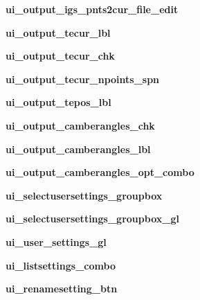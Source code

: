 \begin{DoxyCompactItemize}
{\bfseries ui\+\_\+output\+\_\+igs\+\_\+pnts2cur\+\_\+file\+\_\+edit}
\item 
\hypertarget{a00075_af6b3a50b9ed8b101a02f8cd2103add7a}{}\label{a00075_af6b3a50b9ed8b101a02f8cd2103add7a} 
{\bfseries ui\+\_\+output\+\_\+tecur\+\_\+lbl}
\item 
\hypertarget{a00075_a8a199146fc853fdada7f050f108a22a2}{}\label{a00075_a8a199146fc853fdada7f050f108a22a2} 
{\bfseries ui\+\_\+output\+\_\+tecur\+\_\+chk}
\item 
\hypertarget{a00075_aec9a2b9c0199fa892631d906b1296a13}{}\label{a00075_aec9a2b9c0199fa892631d906b1296a13} 
{\bfseries ui\+\_\+output\+\_\+tecur\+\_\+npoints\+\_\+spn}
\item 
\hypertarget{a00075_a0906e6ac9dd29621615af0e54f1b2768}{}\label{a00075_a0906e6ac9dd29621615af0e54f1b2768} 
{\bfseries ui\+\_\+output\+\_\+tepos\+\_\+lbl}
\item 
\hypertarget{a00075_a6250f7ec5670033a6994818abf3d9b15}{}\label{a00075_a6250f7ec5670033a6994818abf3d9b15} 
{\bfseries ui\+\_\+output\+\_\+camberangles\+\_\+chk}
\item 
\hypertarget{a00075_ae0b09533ea5d38dcba89c010fcdc7886}{}\label{a00075_ae0b09533ea5d38dcba89c010fcdc7886} 
{\bfseries ui\+\_\+output\+\_\+camberangles\+\_\+lbl}
\item 
\hypertarget{a00075_a8c262e36d39977da647517cb97b7ab86}{}\label{a00075_a8c262e36d39977da647517cb97b7ab86} 
{\bfseries ui\+\_\+output\+\_\+camberangles\+\_\+opt\+\_\+combo}
\item 
\hypertarget{a00075_a868061df5f5e844caea1728de203129e}{}\label{a00075_a868061df5f5e844caea1728de203129e} 
{\bfseries ui\+\_\+selectusersettings\+\_\+groupbox}
\item 
\hypertarget{a00075_a5a42530f0dd7f8e7c2da3074565220be}{}\label{a00075_a5a42530f0dd7f8e7c2da3074565220be} 
{\bfseries ui\+\_\+selectusersettings\+\_\+groupbox\+\_\+gl}
\item 
\hypertarget{a00075_aa064aa43c06b096e6d2753909fddf376}{}\label{a00075_aa064aa43c06b096e6d2753909fddf376} 
{\bfseries ui\+\_\+user\+\_\+settings\+\_\+gl}
\item 
\hypertarget{a00075_a1ac2324eaa26fdc7d7a038b7df328a0d}{}\label{a00075_a1ac2324eaa26fdc7d7a038b7df328a0d} 
{\bfseries ui\+\_\+listsettings\+\_\+combo}
\item 
\hypertarget{a00075_a720608a6cc8575e078cd4e807dfe1031}{}\label{a00075_a720608a6cc8575e078cd4e807dfe1031} 
{\bfseries ui\+\_\+renamesetting\+\_\+btn}
\item 
\hypertarget{a00075_af95ad0699234293c4dbeaa2fbf3af607}{}\label{a00075_af95ad0699234293c4dbeaa2fbf3af607} 

\end{DoxyCompactItemize}
